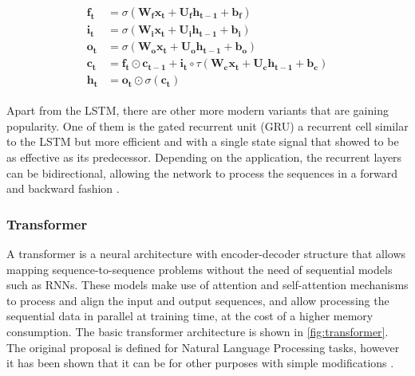 \begin{align}
\label{eq:LSTM}
\begin{split}
	\mathbf{f_t} &= \sigma(\mathbf{W_f} \mathbf{x_t} + \mathbf{U_f} \mathbf{h_{t-1}} + \mathbf{b_f})\\
	\mathbf{i_t} &= \sigma(\mathbf{W_i} \mathbf{x_t} + \mathbf{U_i} \mathbf{h_{t-1}} + \mathbf{b_i})\\
	\mathbf{o_t} &= \sigma(\mathbf{W_o} \mathbf{x_t} + \mathbf{U_o} \mathbf{h_{t-1}} + \mathbf{b_o})\\
	\mathbf{c_t} &= \mathbf{f_t} \odot \mathbf{c_{t-1}} + \mathbf{i_t} \circ \tau (\mathbf{W_c} \mathbf{x_t} + \mathbf{U_c} \mathbf{h_{t-1}} + \mathbf{b_c})\\
	\mathbf{h_t} &= \mathbf{o_t} \odot \sigma(\mathbf{c_t})
\end{split}
\end{align}

Apart from the LSTM, there are other more modern variants that are gaining popularity. One of them is the gated recurrent unit (GRU) \autocite{chung2014} a recurrent cell similar to the LSTM but more efficient and with a single state signal that showed to be as effective as its predecessor. Depending on the application, the recurrent layers can be bidirectional, allowing the network to process the sequences in a forward and backward fashion \autocite{schuster1997}.

\subsubsection{Transformer} \label{sec:transformer}
A transformer \autocite{vaswani2017} is a neural architecture with encoder-decoder structure that allows mapping sequence-to-sequence \autocite{sutskever2014} problems without the need of sequential models such as RNNs. These models make use of attention and self-attention mechanisms \autocite{bahdanau2015} to process and align the input and output sequences, and allow processing the sequential data in parallel at training time, at the cost of a higher memory consumption. The basic transformer  architecture is shown in \ref{fig:transformer}. The original proposal is defined for Natural Language Processing tasks, however it has been shown that it can be for other purposes with simple modifications \autocite{naihan2019, jiarui2021, sanyuan2021}.

